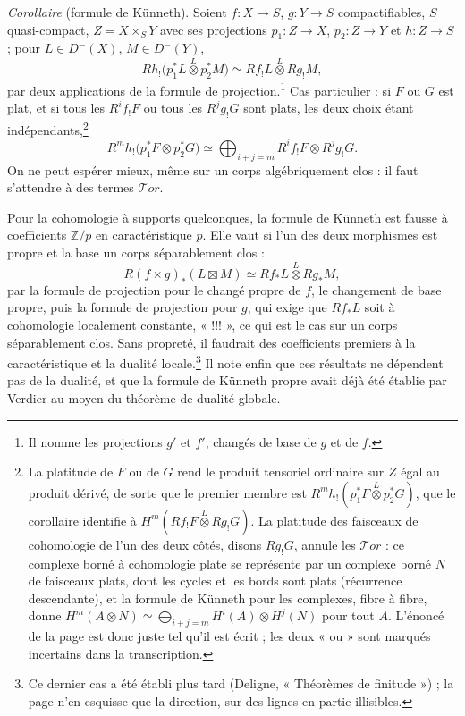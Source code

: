 \documentclass[11pt,a4paper]{article}
\begin{document}
\emph{Corollaire} (formule de Künneth). Soient $f : X \to S$, $g : Y \to S$
compactifiables, $S$ quasi-compact, $Z = X \times_{S} Y$ avec ses projections
$p_{1} : Z \to X$, $p_{2} : Z \to Y$ et $h : Z \to S$ ; pour $L \in D^{-}(X)$,
$M \in D^{-}(Y)$,
\[
  Rh_{!}\bigl(p_{1}^{*}L \overset{L}{\otimes} p_{2}^{*}M\bigr) \simeq
  Rf_{!}L \overset{L}{\otimes} Rg_{!}M,
\]
par deux applications de la formule de projection.\footnote{Il nomme les
projections $g'$ et $f'$, changés de base de $g$ et de $f$.} Cas particulier :
si $F$ ou $G$ est plat, et si tous les $R^{i}f_{!}F$ ou tous les
$R^{j}g_{!}G$ sont plats, les deux choix étant indépendants,\footnote{La
platitude de $F$ ou de $G$ rend le produit tensoriel ordinaire sur $Z$ égal au
produit dérivé, de sorte que le premier membre est
$R^{m}h_{!}(p_{1}^{*}F \overset{L}{\otimes} p_{2}^{*}G)$, que le corollaire
identifie à $H^{m}(Rf_{!}F \overset{L}{\otimes} Rg_{!}G)$. La platitude des
faisceaux de cohomologie de l'un des deux côtés, disons $Rg_{!}G$, annule les
$\mathcal{T}or$ : ce complexe borné à cohomologie plate se représente par un
complexe borné $N$ de faisceaux plats, dont les cycles et les bords sont plats
(récurrence descendante), et la formule de Künneth pour les complexes, fibre à
fibre, donne $H^{m}(A \otimes N) \simeq \bigoplus_{i+j=m} H^{i}(A) \otimes
H^{j}(N)$ pour tout $A$. L'énoncé de la page est donc juste tel qu'il est
écrit ; les deux « ou » sont marqués incertains dans la transcription.}
\[
  R^{m}h_{!}\bigl(p_{1}^{*}F \otimes p_{2}^{*}G\bigr) \simeq
  \bigoplus_{i+j=m} R^{i}f_{!}F \otimes R^{j}g_{!}G.
\]
On ne peut espérer mieux, même sur un corps algébriquement
clos : il faut s'attendre à des termes $\mathcal{T}or$.

Pour la cohomologie à supports quelconques, la formule de Künneth est fausse à
coefficients $\mathbb{Z}/p$ en caractéristique $p$. Elle vaut si l'un des deux
morphismes est propre et la base un corps séparablement clos :
\[
  R(f \times g)_{*}(L \boxtimes M) \simeq Rf_{*}L \overset{L}{\otimes}
  Rg_{*}M,
\]
par la formule de projection pour le changé propre de $f$, le changement de base
propre, puis la formule de projection pour $g$, qui exige que $Rf_{*}L$ soit à
cohomologie localement constante, « !!! », ce qui est le cas sur un corps
séparablement clos. Sans propreté, il faudrait des coefficients premiers à la
caractéristique et la dualité locale.\footnote{Ce dernier cas a été établi plus
tard (Deligne, « Théorèmes de finitude ») ; la page n'en esquisse que la
direction, sur des lignes en partie illisibles.} Il note enfin que ces résultats
ne dépendent pas de la dualité, et que la formule de Künneth propre avait déjà
été établie par Verdier au moyen du théorème de dualité globale.
\end{document}
